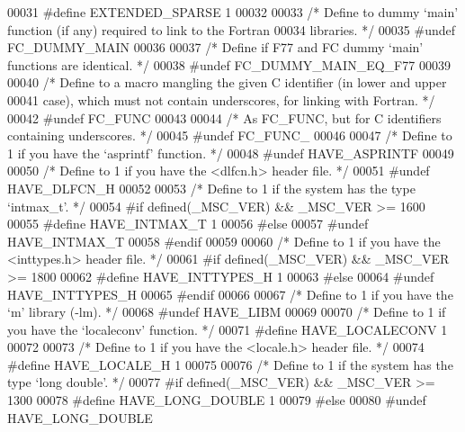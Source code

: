 \begin{DoxyCode}
00031 \textcolor{preprocessor}{#define EXTENDED\_SPARSE 1}
00032 
00033 \textcolor{comment}{/* Define to dummy `main' function (if any) required to link to the Fortran}
00034 \textcolor{comment}{   libraries. */}
00035 \textcolor{preprocessor}{#undef FC\_DUMMY\_MAIN}
00036 
00037 \textcolor{comment}{/* Define if F77 and FC dummy `main' functions are identical. */}
00038 \textcolor{preprocessor}{#undef FC\_DUMMY\_MAIN\_EQ\_F77}
00039 
00040 \textcolor{comment}{/* Define to a macro mangling the given C identifier (in lower and upper}
00041 \textcolor{comment}{   case), which must not contain underscores, for linking with Fortran. */}
00042 \textcolor{preprocessor}{#undef FC\_FUNC}
00043 
00044 \textcolor{comment}{/* As FC\_FUNC, but for C identifiers containing underscores. */}
00045 \textcolor{preprocessor}{#undef FC\_FUNC\_}
00046 
00047 \textcolor{comment}{/* Define to 1 if you have the `asprintf' function. */}
00048 \textcolor{preprocessor}{#undef HAVE\_ASPRINTF}
00049 
00050 \textcolor{comment}{/* Define to 1 if you have the <dlfcn.h> header file. */}
00051 \textcolor{preprocessor}{#undef HAVE\_DLFCN\_H}
00052 
00053 \textcolor{comment}{/* Define to 1 if the system has the type `intmax\_t'. */}
00054 \textcolor{preprocessor}{#if defined(\_MSC\_VER) && \_MSC\_VER >= 1600}
00055 \textcolor{preprocessor}{#define HAVE\_INTMAX\_T 1}
00056 \textcolor{preprocessor}{#else}
00057 \textcolor{preprocessor}{#undef HAVE\_INTMAX\_T}
00058 \textcolor{preprocessor}{#endif}
00059 
00060 \textcolor{comment}{/* Define to 1 if you have the <inttypes.h> header file. */}
00061 \textcolor{preprocessor}{#if defined(\_MSC\_VER) && \_MSC\_VER >= 1800}
00062 \textcolor{preprocessor}{#define HAVE\_INTTYPES\_H 1}
00063 \textcolor{preprocessor}{#else}
00064 \textcolor{preprocessor}{#undef HAVE\_INTTYPES\_H}
00065 \textcolor{preprocessor}{#endif}
00066 
00067 \textcolor{comment}{/* Define to 1 if you have the `m' library (-lm). */}
00068 \textcolor{preprocessor}{#undef HAVE\_LIBM}
00069 
00070 \textcolor{comment}{/* Define to 1 if you have the `localeconv' function. */}
00071 \textcolor{preprocessor}{#define HAVE\_LOCALECONV 1}
00072 
00073 \textcolor{comment}{/* Define to 1 if you have the <locale.h> header file. */}
00074 \textcolor{preprocessor}{#define HAVE\_LOCALE\_H 1}
00075 
00076 \textcolor{comment}{/* Define to 1 if the system has the type `long double'. */}
00077 \textcolor{preprocessor}{#if defined(\_MSC\_VER) && \_MSC\_VER >= 1300}
00078 \textcolor{preprocessor}{#define HAVE\_LONG\_DOUBLE 1}
00079 \textcolor{preprocessor}{#else}
00080 \textcolor{preprocessor}{#undef HAVE\_LONG\_DOUBLE}

\end{DoxyCode}
